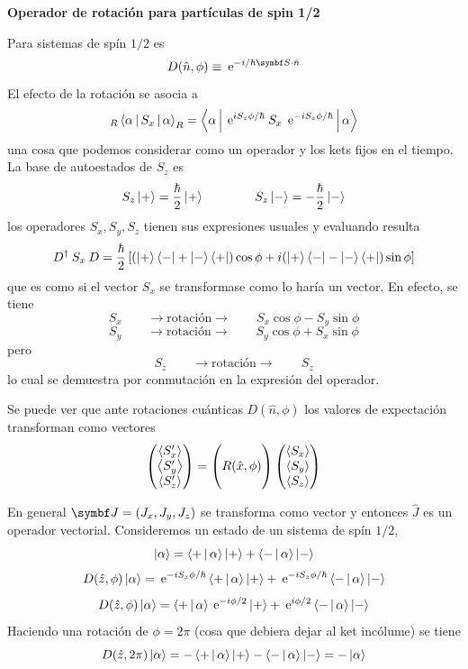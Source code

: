 \documentclass[10pt,oneside]{CBFT_book}
\begin{document}
\begin{ejemplo}{\bf Operador de rotación para partículas de spin 1/2}
 
Para sistemas de spín $1/2$ es 
\[
	D(\hat{n},\phi) \equiv \euler^{-i/\hbar \vb{S}\cdot\hat{n} }
\] 
El efecto de la rotación se asocia a 
\[
	_R\Braket{\alpha|S_x|\alpha}_R = \Braket{ \alpha | \:\mathrm{e}^{i S_z \phi /\hbar} 
	\: S_x \: \:\mathrm{e}^{-i S_z \phi /\hbar}  | \alpha }
\]
una cosa que podemos considerar como un operador y los kets fijos en el tiempo.
La base de autoestados de $S_z$ es 
\[
	S_z\Ket{+} = \frac{\hbar}{2}\Ket{+} \qquad \qquad 
	S_z\Ket{-} = -\frac{\hbar}{2}\Ket{-}
\]
los operadores $S_x, S_y, S_z$ tienen sus expresiones usuales y evaluando resulta
\[
	D^\dagger \: S_x \: D =
	\frac{\hbar}{2} 
	\left[
	( \Ket{+}\Bra{-} + \Ket{-}\Bra{+} ) \cos\phi + i ( \Ket{+}\Bra{-} - \Ket{-}\Bra{+}  )\sin \phi 
	\right]
\]
que es como si el vector $S_x$ se transformase como lo haría un vector. En efecto,
se tiene
\[
	S_x \qquad \to \text{rotación} \to \qquad S_x \cos\phi - S_y \sin\phi
\]
\[
	S_y \qquad \to \text{rotación} \to \qquad S_y \cos\phi + S_x \sin\phi
\]
pero 
\[
	S_z \qquad \to \text{rotación} \to \qquad S_z
\]
lo cual se demuestra por conmutación en la expresión del operador.
 
Se puede ver que ante rotaciones cuánticas $D(\hat{n},\phi)$ los valores de expectación transforman como 
vectores
\[
	\begin{pmatrix} \Braket{S_x'} \\ \Braket{S_y'} \\ \Braket{S_z'}	\end{pmatrix} =	\begin{pmatrix} 
	\\
	 R(\hat{x},\phi) \\
	 \\
	\end{pmatrix}\begin{pmatrix} \Braket{S_x} \\ \Braket{S_y} \\ \Braket{S_z} \end{pmatrix}
\]

En general $\vb{J} = (J_x, J_y, J_z)$ se transforma como vector y entonces $\hat{J}$ es un operador vectorial.
Consideremos un estado de un sistema de spín $1/2$,
\[
	\Ket{\alpha} = \Braket{+|\alpha}\Ket{+} + \Braket{-|\alpha}\Ket{-}
\]
\[
	D(\hat{z},\phi)\Ket{\alpha} = \:\mathrm{e}^{-iS_z\phi/\hbar}\Braket{+|\alpha}\Ket{+} +
		\:\mathrm{e}^{-iS_z\phi/\hbar} \Braket{-|\alpha}\Ket{-}
\]
\[
	D(\hat{z},\phi)\Ket{\alpha} = \Braket{+|\alpha} \:\mathrm{e}^{-i\phi/2} \Ket{+} +
		\:\mathrm{e}^{i\phi/2} \Braket{-|\alpha}\Ket{-}
\]
Haciendo una rotación de $\phi=2\pi$ (cosa que debiera dejar al ket incólume) se tiene 
\[
	D(\hat{z},2\pi) \Ket{\alpha} = - \Braket{+|\alpha}\Ket{+} - \Braket{-|\alpha}\Ket{-} = -\Ket{\alpha}
\]


\end{ejemplo}
\end{document}
